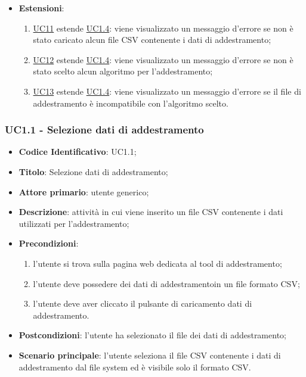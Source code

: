 \begin{itemize}
\begin{enumerate}
				\end{enumerate}
			\item\textbf{Estensioni}: 
				\begin{enumerate}
					\item \hyperref[par:UC11]{UC11} estende \hyperref[par:UC1.4]{UC1.4}: viene visualizzato un messaggio d'errore se non è stato caricato alcun file CSV contenente i dati di addestramento;
					\item \hyperref[par:UC12]{UC12} estende \hyperref[par:UC1.4]{UC1.4}: viene visualizzato un messaggio d'errore se non è stato scelto alcun algoritmo per l'addestramento;
					\item \hyperref[par:UC13]{UC13} estende \hyperref[par:UC1.4]{UC1.4}: viene visualizzato un messaggio d'errore se il file di addestramento è incompatibile con l'algoritmo scelto.
				\end{enumerate}
			
		\end{itemize}
		
		\label{par:UC1.1}
		\subsubsection{UC1.1 - Selezione dati di addestramento }
		\begin{itemize}
			\item\textbf{Codice Identificativo}: UC1.1;
			\item\textbf{Titolo}: Selezione dati di addestramento;
			\item\textbf{Attore primario}: utente generico;
			\item\textbf{Descrizione}: attività in cui viene inserito un file CSV contenente i dati utilizzati per l'addestramento;
			\item\textbf{Precondizioni}:
				\begin{enumerate}
					\item l'utente si trova sulla pagina web dedicata al tool di addestramento;
					\item l'utente deve possedere dei dati di addestramento\glo in un file formato CSV\glo;
					\item l'utente deve aver cliccato il pulsante di caricamento dati di addestramento.
				\end{enumerate}
			\item\textbf{Postcondizioni}: l'utente ha selezionato il file dei dati di addestramento;
			\item\textbf{Scenario principale}: l'utente seleziona il file CSV contenente i dati di addestramento dal file system ed è visibile solo il formato CSV.
		\end{itemize}
		

